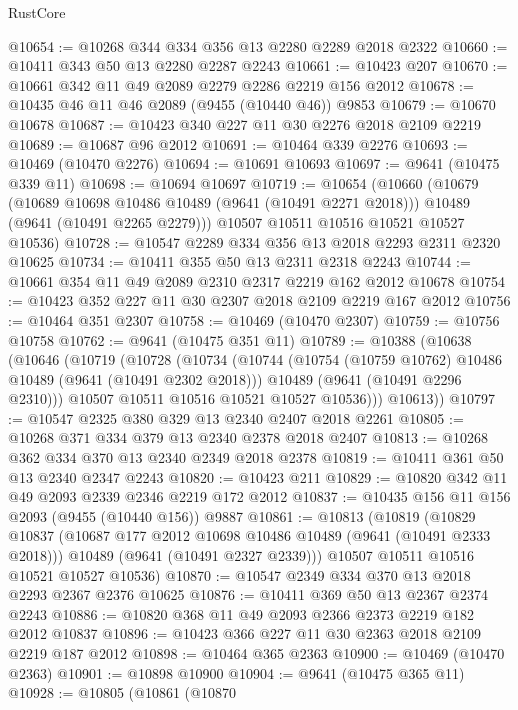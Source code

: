 \begin{lexlean}{RustCore}
\begin{coremodule}
@10654 := @10268 @344 @334 @356 @13 @2280 @2289 @2018 @2322
@10660 := @10411 @343 @50 @13 @2280 @2287 @2243
@10661 := @10423 @207
@10670 := @10661 @342 @11 @49 @2089 @2279 @2286 @2219 @156 @2012
@10678 := @10435 @46 @11 @46 @2089 (@9455 (@10440 @46)) @9853
@10679 := @10670 @10678
@10687 := @10423 @340 @227 @11 @30 @2276 @2018 @2109 @2219
@10689 := @10687 @96 @2012
@10691 := @10464 @339 @2276
@10693 := @10469 (@10470 @2276)
@10694 := @10691 @10693
@10697 := @9641 (@10475 @339 @11)
@10698 := @10694 @10697
@10719 := @10654
    (@10660
      (@10679
        (@10689 @10698 @10486 @10489 (@9641 (@10491 @2271 @2018)))
        @10489
        (@9641 (@10491 @2265 @2279)))
      @10507
      @10511
      @10516
      @10521
      @10527
      @10536)
@10728 := @10547 @2289 @334 @356 @13 @2018 @2293 @2311 @2320 @10625
@10734 := @10411 @355 @50 @13 @2311 @2318 @2243
@10744 := @10661 @354 @11 @49 @2089 @2310 @2317 @2219 @162 @2012 @10678
@10754 := @10423 @352 @227 @11 @30 @2307 @2018 @2109 @2219 @167 @2012
@10756 := @10464 @351 @2307
@10758 := @10469 (@10470 @2307)
@10759 := @10756 @10758
@10762 := @9641 (@10475 @351 @11)
@10789 := @10388
    (@10638
      (@10646
        (@10719
          (@10728
            (@10734
              (@10744
                (@10754 (@10759 @10762) @10486 @10489 (@9641 (@10491 @2302 @2018)))
                @10489
                (@9641 (@10491 @2296 @2310)))
              @10507
              @10511
              @10516
              @10521
              @10527
              @10536)))
        @10613))
@10797 := @10547 @2325 @380 @329 @13 @2340 @2407 @2018 @2261
@10805 := @10268 @371 @334 @379 @13 @2340 @2378 @2018 @2407
@10813 := @10268 @362 @334 @370 @13 @2340 @2349 @2018 @2378
@10819 := @10411 @361 @50 @13 @2340 @2347 @2243
@10820 := @10423 @211
@10829 := @10820 @342 @11 @49 @2093 @2339 @2346 @2219 @172 @2012
@10837 := @10435 @156 @11 @156 @2093 (@9455 (@10440 @156)) @9887
@10861 := @10813
    (@10819
      (@10829
        @10837
        (@10687 @177 @2012 @10698 @10486 @10489 (@9641 (@10491 @2333 @2018)))
        @10489
        (@9641 (@10491 @2327 @2339)))
      @10507
      @10511
      @10516
      @10521
      @10527
      @10536)
@10870 := @10547 @2349 @334 @370 @13 @2018 @2293 @2367 @2376 @10625
@10876 := @10411 @369 @50 @13 @2367 @2374 @2243
@10886 := @10820 @368 @11 @49 @2093 @2366 @2373 @2219 @182 @2012 @10837
@10896 := @10423 @366 @227 @11 @30 @2363 @2018 @2109 @2219 @187 @2012
@10898 := @10464 @365 @2363
@10900 := @10469 (@10470 @2363)
@10901 := @10898 @10900
@10904 := @9641 (@10475 @365 @11)
@10928 := @10805
    (@10861
      (@10870

\end{coremodule}
\end{lexlean}
